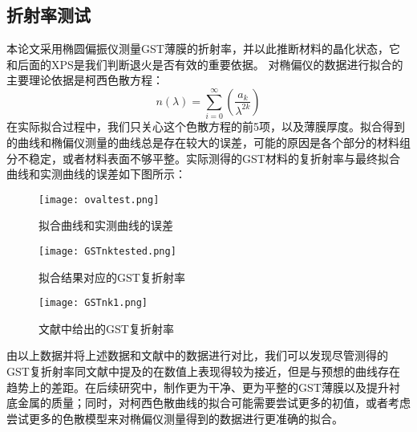 \subsection{折射率测试}
本论文采用椭圆偏振仪测量GST薄膜的折射率，并以此推断材料的晶化状态，它和后面的XPS是我们判断退火是否有效的重要依据。
对椭偏仪的数据进行拟合的主要理论依据是柯西色散方程：
\begin{equation}
n\left ( \lambda \right ) = \sum_{i=0}^{\infty} \left (\frac{a_{k}}{\lambda ^{2k}} \right )
\end{equation}
在实际拟合过程中，我们只关心这个色散方程的前5项，以及薄膜厚度。拟合得到的曲线和椭偏仪测量的曲线总是存在较大的误差，可能的原因是各个部分的材料组分不稳定，或者材料表面不够平整。实际测得的GST材料的复折射率与最终拟合曲线和实测曲线的误差如下图所示：
\begin{figure}[H] %
  \centering
  \texttt{[image: ovaltest.png]}
  \caption{拟合曲线和实测曲线的误差}
  \label{fig:oval}
\end{figure}
\begin{figure}[H] %
  \centering
  \texttt{[image: GSTnktested.png]}
  \caption{拟合结果对应的GST复折射率}
  \label{fig:nktested}
\end{figure}
\begin{figure}[H] %
  \centering
  \texttt{[image: GSTnk1.png]} \cite{GSTnk}
  \caption{文献\cite{GSTnk}中给出的GST复折射率}
  \label{fig:nkGST}
\end{figure}


由以上数据并将上述数据和文献中的数据进行对比，我们可以发现尽管测得的GST复折射率同文献中提及的在数值上表现得较为接近，但是与预想的曲线存在趋势上的差距。在后续研究中，制作更为干净、更为平整的GST薄膜以及提升衬底金属的质量；同时，对柯西色散曲线的拟合可能需要尝试更多的初值，或者考虑尝试更多的色散模型来对椭偏仪测量得到的数据进行更准确的拟合。

